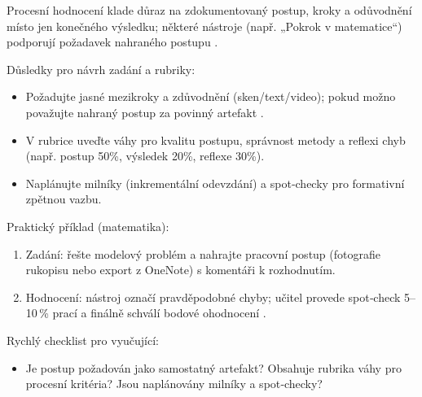 Procesní hodnocení klade důraz na zdokumentovaný postup, kroky a odůvodnění místo jen konečného výsledku; některé nástroje (např. „Pokrok v matematice“) podporují požadavek nahraného postupu \cite{kb_ai_101_tipu_pdf_04e4a115_page_8_1}.

Důsledky pro návrh zadání a rubriky:
\begin{itemize}
  \item Požadujte jasné mezikroky a zdůvodnění (sken/text/video); pokud možno považujte nahraný postup za povinný artefakt \cite{kb_ai_101_tipu_pdf_04e4a115_page_8_1}.
  \item V rubrice uveďte váhy pro kvalitu postupu, správnost metody a reflexi chyb (např. postup 50\%, výsledek 20\%, reflexe 30\%).
  \item Naplánujte milníky (inkrementální odevzdání) a spot‑checky pro formativní zpětnou vazbu.
\end{itemize}

Praktický příklad (matematika):
\begin{enumerate}\item Zadání: řešte modelový problém a nahrajte pracovní postup (fotografie rukopisu nebo export z OneNote) s komentáři k rozhodnutím.\item Hodnocení: nástroj označí pravděpodobné chyby; učitel provede spot‑check 5–10\,\% prací a finálně schválí bodové ohodnocení \cite{kb_ai_101_tipu_pdf_04e4a115_page_8_1}.\end{enumerate}

Rychlý checklist pro vyučující:
\begin{itemize}
  \item Je postup požadován jako samostatný artefakt? Obsahuje rubrika váhy pro procesní kritéria? Jsou naplánovány milníky a spot‑checky?
\end{itemize}